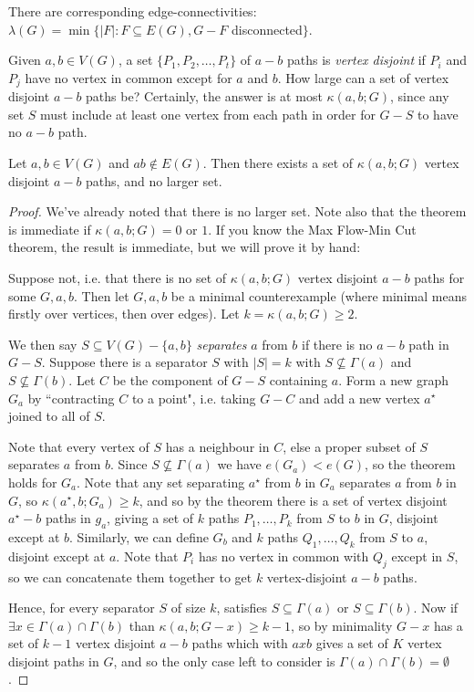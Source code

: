 \documentclass[10pt,a4paper]{article}
\begin{document}
There are corresponding edge-connectivities: $\lambda(G) = \min\{|F|:F\subseteq E(G), G-F $ disconnected$\}$.

Given $a,b \in V(G)$, a set $\{P_1, P_2, \ldots, P_t\}$ of $a-b$ paths is \emph{vertex disjoint} if $P_i$ and $P_j$ have no vertex in common except for $a$ and $b$. How large can a set of vertex disjoint $a-b$ paths be? Certainly, the answer is at most $\kappa(a,b;G)$, since any set $S$ must include at least one vertex from each path in order for $G-S$ to have no $a-b$ path.

\begin{theorem}[Menger]
Let $a,b\in V(G)$ and $ab \notin E(G)$. Then there exists a set of $\kappa(a,b;G)$ vertex disjoint $a-b$ paths, and no larger set.
\end{theorem}
\begin{proof}
We've already noted that there is no larger set. Note also that the theorem is immediate if $\kappa(a,b;G) = 0$ or $1$. If you know the Max Flow-Min Cut theorem, the result is immediate, but we will prove it by hand:

Suppose not, i.e. that there is no set of $\kappa(a,b;G)$ vertex disjoint $a-b$ paths for some $G, a, b$. Then let $G, a, b$ be a minimal counterexample (where minimal means firstly over vertices, then over edges). Let $k = \kappa(a,b;G) \geq 2$.

We then say $S \subseteq V(G) - \{a,b\}$ \emph{separates} $a$ from $b$ if there is no $a-b$ path in $G-S$.  Suppose there is a separator $S$ with $|S|=k$ with $S\nsubseteq \Gamma(a)$ and $S \nsubseteq \Gamma(b)$. Let $C$ be the component of $G-S$ containing $a$. Form a new graph $G_a$ by ``contracting $C$ to a point", i.e. taking $G-C$ and add a new vertex $a^\star$ joined to all of $S$.
\begin{center}
\end{center}
Note that every vertex of $S$ has a neighbour in $C$, else a proper subset of $S$ separates $a$ from $b$. Since $S\nsubseteq \Gamma(a)$ we have $e(G_a) < e(G)$, so the theorem holds for $G_a$. Note that any set separating $a^\star$ from $b$ in $G_a$ separates $a$ from $b$ in $G$, so $\kappa(a^\star, b; G_a) \geq k$, and so by the theorem there is a set of vertex disjoint $a^\star-b$ paths in $g_a$, giving a set of $k$ paths $P_1, \ldots, P_k$ from $S$ to $b$ in $G$, disjoint except at $b$. Similarly, we can define $G_b$ and $k$ paths $Q_1, \ldots, Q_k$ from $S$ to $a$, disjoint except at $a$. Note that $P_i$ has no vertex in common with $Q_j$ except in $S$, so we can concatenate them together to get $k$ vertex-disjoint $a-b$ paths.

Hence, for every separator $S$ of size $k$, satisfies $S\subseteq \Gamma(a)$ or $S\subseteq \Gamma(b)$. Now if $\exists x \in \Gamma(a) \cap \Gamma(b)$ than $\kappa(a,b;G-x) \geq k-1$, so by minimality $G-x$ has a set of $k-1$ vertex disjoint $a-b$ paths which with $axb$ gives a set of $K$ vertex disjoint paths in $G$, and so the only case left to consider is $\Gamma(a) \cap \Gamma(b) = \emptyset$.
\end{proof}
\end{document}
